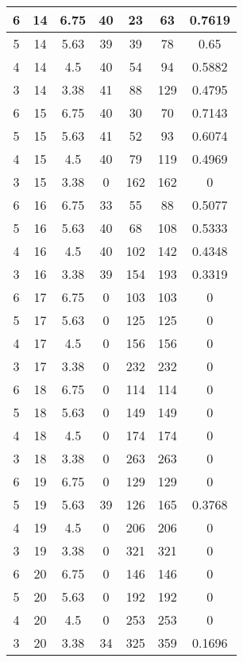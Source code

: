 \documentclass[letterpaper, 12pt]{article}
\begin{document}
\begin{longtable}{|c|c|c|c|c|c|c|}
6 & 14 & 6.75 & 40 & 23 & 63 & 0.7619 \\
\hline
5 & 14 & 5.63 & 39 & 39 & 78 & 0.65 \\
\hline
4 & 14 & 4.5 & 40 & 54 & 94 & 0.5882 \\
\hline
3 & 14 & 3.38 & 41 & 88 & 129 & 0.4795 \\
\hline
6 & 15 & 6.75 & 40 & 30 & 70 & 0.7143 \\
\hline
5 & 15 & 5.63 & 41 & 52 & 93 & 0.6074 \\
\hline
4 & 15 & 4.5 & 40 & 79 & 119 & 0.4969 \\
\hline
3 & 15 & 3.38 & 0 & 162 & 162 & 0 \\
\hline
6 & 16 & 6.75 & 33 & 55 & 88 & 0.5077 \\
\hline
5 & 16 & 5.63 & 40 & 68 & 108 & 0.5333 \\
\hline
4 & 16 & 4.5 & 40 & 102 & 142 & 0.4348 \\
\hline
3 & 16 & 3.38 & 39 & 154 & 193 & 0.3319 \\
\hline
6 & 17 & 6.75 & 0 & 103 & 103 & 0 \\
\hline
5 & 17 & 5.63 & 0 & 125 & 125 & 0 \\
\hline
4 & 17 & 4.5 & 0 & 156 & 156 & 0 \\
\hline
3 & 17 & 3.38 & 0 & 232 & 232 & 0 \\
\hline
6 & 18 & 6.75 & 0 & 114 & 114 & 0 \\
\hline
5 & 18 & 5.63 & 0 & 149 & 149 & 0 \\
\hline
4 & 18 & 4.5 & 0 & 174 & 174 & 0 \\
\hline
3 & 18 & 3.38 & 0 & 263 & 263 & 0 \\
\hline
6 & 19 & 6.75 & 0 & 129 & 129 & 0 \\
\hline
5 & 19 & 5.63 & 39 & 126 & 165 & 0.3768 \\
\hline
4 & 19 & 4.5 & 0 & 206 & 206 & 0 \\
\hline
3 & 19 & 3.38 & 0 & 321 & 321 & 0 \\
\hline
6 & 20 & 6.75 & 0 & 146 & 146 & 0 \\
\hline
5 & 20 & 5.63 & 0 & 192 & 192 & 0 \\
\hline
4 & 20 & 4.5 & 0 & 253 & 253 & 0 \\
\hline
3 & 20 & 3.38 & 34 & 325 & 359 & 0.1696 \\
\hline
\end{longtable}
\end{document}
